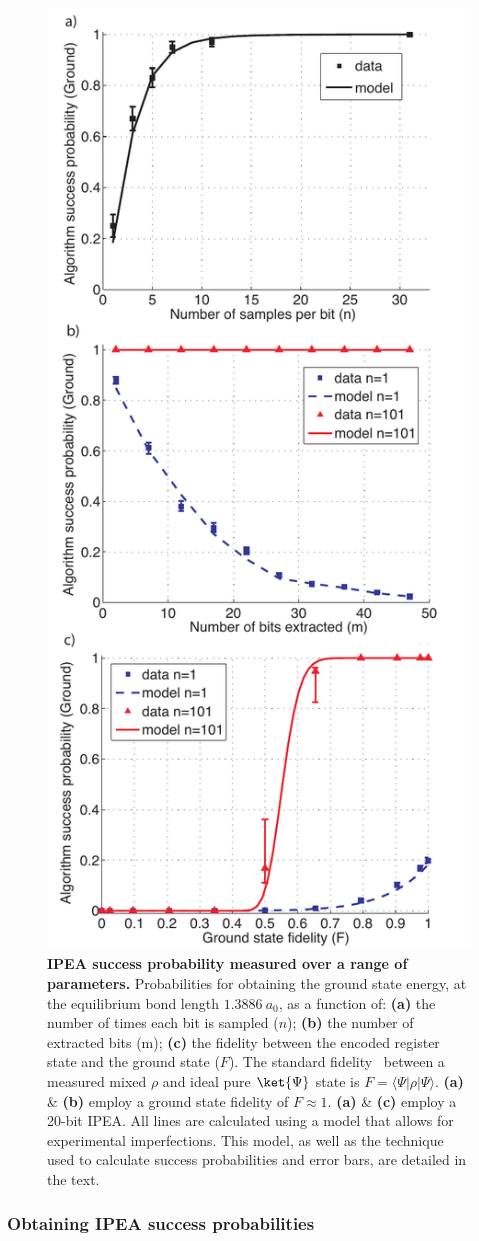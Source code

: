 \documentclass[11pt,oneside,final]{huthesis}%
\begin{document}
\begin{figure}
\begin{center}
\includegraphics[width=0.45 \columnwidth]{./figures/figure3_041108.pdf}
\end{center}
\label{fig:IPEAresults}
\caption{\textbf{IPEA success probability measured over a range of
parameters.}
Probabilities for obtaining the ground state energy, at the equilibrium bond length $1.3886~a_0$,
as a function of:
\textbf{(a)}  the number of times each bit is sampled ($n$);
\textbf{(b)} the number of extracted bits (m);
\textbf{(c)} the fidelity between the encoded register state and the ground state ($F$). 
The standard fidelity~\cite{Nielsen00} between a measured mixed $\rho$ and ideal pure 
$\ket{\Psi}$ state is $F=\langle\Psi|\rho|\Psi\rangle$. 
\textbf{(a)} \& \textbf{(b)} employ a
ground state fidelity of $F\approx 1$. \textbf{(a)} \& \textbf{(c)} employ a 20-bit IPEA.
All lines are calculated
using a model that allows for experimental imperfections. This model, as well as the
technique used to calculate success probabilities and error bars, are detailed in the text.}
\end{figure}


\subsubsection{Obtaining IPEA success probabilities}
\end{document}
